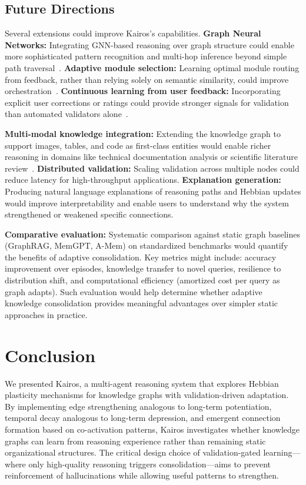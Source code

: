 \documentclass{article}
\begin{document}
\subsection{Future Directions}

Several extensions could improve Kairos's capabilities. \textbf{Graph Neural Networks:} Integrating GNN-based reasoning over graph structure could enable more sophisticated pattern recognition and multi-hop inference beyond simple path traversal~\citep{luo2024rog}. \textbf{Adaptive module selection:} Learning optimal module routing from feedback, rather than relying solely on semantic similarity, could improve orchestration~\citep{chen2024pog}. \textbf{Continuous learning from user feedback:} Incorporating explicit user corrections or ratings could provide stronger signals for validation than automated validators alone~\citep{xu2025amem}.

\textbf{Multi-modal knowledge integration:} Extending the knowledge graph to support images, tables, and code as first-class entities would enable richer reasoning in domains like technical documentation analysis or scientific literature review~\citep{edge2024graphrag}. \textbf{Distributed validation:} Scaling validation across multiple nodes could reduce latency for high-throughput applications. \textbf{Explanation generation:} Producing natural language explanations of reasoning paths and Hebbian updates would improve interpretability and enable users to understand why the system strengthened or weakened specific connections.

\textbf{Comparative evaluation:} Systematic comparison against static graph baselines (GraphRAG, MemGPT, A-Mem) on standardized benchmarks would quantify the benefits of adaptive consolidation. Key metrics might include: accuracy improvement over episodes, knowledge transfer to novel queries, resilience to distribution shift, and computational efficiency (amortized cost per query as graph adapts). Such evaluation would help determine whether adaptive knowledge consolidation provides meaningful advantages over simpler static approaches in practice.

\section{Conclusion}

We presented Kairos, a multi-agent reasoning system that explores Hebbian plasticity mechanisms for knowledge graphs with validation-driven adaptation. By implementing edge strengthening analogous to long-term potentiation, temporal decay analogous to long-term depression, and emergent connection formation based on co-activation patterns, Kairos investigates whether knowledge graphs can learn from reasoning experience rather than remaining static organizational structures. The critical design choice of validation-gated learning—where only high-quality reasoning triggers consolidation—aims to prevent reinforcement of hallucinations while allowing useful patterns to strengthen.
\end{document}
